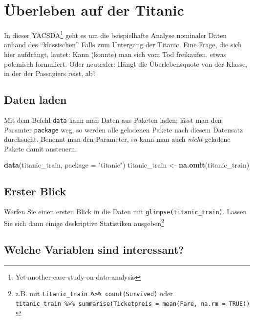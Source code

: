 \documentclass[12pt,ngerman,]{book}
\makeatletter
\newenvironment{Shaded}{\begin{snugshade}}{\end{snugshade}}
\newcommand{\KeywordTok}[1]{\textcolor[rgb]{0.13,0.29,0.53}{\textbf{#1}}}
\newcommand{\DataTypeTok}[1]{\textcolor[rgb]{0.13,0.29,0.53}{#1}}
\newcommand{\StringTok}[1]{\textcolor[rgb]{0.31,0.60,0.02}{#1}}
\newcommand{\NormalTok}[1]{#1}
\let\rmarkdownfootnote\footnote%
\def\footnote{\protect\rmarkdownfootnote}
\newenvironment{kframe}{%
\medskip{}
\setlength{\fboxsep}{.8em}
 \def\at@end@of@kframe{}%
 \ifinner\ifhmode%
  \def\at@end@of@kframe{\end{minipage}}%
  \begin{minipage}{\columnwidth}%
 \fi\fi%
 \def\FrameCommand##1{\hskip\@totalleftmargin \hskip-\fboxsep
 \colorbox{shadecolor}{##1}\hskip-\fboxsep
     \hskip-\linewidth \hskip-\@totalleftmargin \hskip\columnwidth}%
 \MakeFramed {\advance\hsize-\width
   \@totalleftmargin\z@ \linewidth\hsize
   \@setminipage}}%
 {\par\unskip\endMakeFramed%
 \at@end@of@kframe}
\renewenvironment{Shaded}{\begin{kframe}}{\end{kframe}}
\theoremstyle{definition}
\theoremstyle{definition}
\theoremstyle{remark}
\makeatother
\begin{document}
\section{Überleben auf der Titanic}\label{uberleben-auf-der-titanic}

In dieser YACSDA\footnote{Yet-another-case-study-on-data-analysis} geht
es um die beispielhafte Analyse nominaler Daten anhand des
``klassischen'' Falls zum Untergang der Titanic. Eine Frage, die sich
hier aufdrängt, lautet: Kann (konnte) man sich vom Tod freikaufen, etwas
polemisch formuliert. Oder neutraler: Hängt die Überlebensquote von der
Klasse, in der der Passagiers reist, ab?

\subsection{Daten laden}\label{daten-laden}

Mit dem Befehl \texttt{data} kann man Daten aus Paketen laden; lässt man
den Paramter \texttt{package} weg, so werden alle geladenen Pakete nach
diesem Datensatz durchsucht. Benennt man den Parameter, so kann man auch
\emph{nicht} geladene Pakete damit ansteuern.

\begin{Shaded}
\begin{Highlighting}[]
\KeywordTok{data}\NormalTok{(titanic_train, }\DataTypeTok{package =} \StringTok{"titanic"}\NormalTok{)}
\NormalTok{titanic_train <-}\StringTok{ }\KeywordTok{na.omit}\NormalTok{(titanic_train)}
\end{Highlighting}
\end{Shaded}

\subsection{Erster Blick}\label{erster-blick}

Werfen Sie einen ersten Blick in die Daten mit
\texttt{glimpse(titanic\_train)}. Lassen Sie sich dann einige
deskriptive Statistiken ausgeben\footnote{z.B. mit
  \texttt{titanic\_train\ \%\textgreater{}\%\ count(Survived)} oder
  \texttt{titanic\_train\ \%\textgreater{}\%\ summarise(Ticketpreis\ =\ mean(Fare,\ na.rm\ =\ TRUE))}}

\subsection{Welche Variablen sind
interessant?}\label{welche-variablen-sind-interessant}
\end{document}
